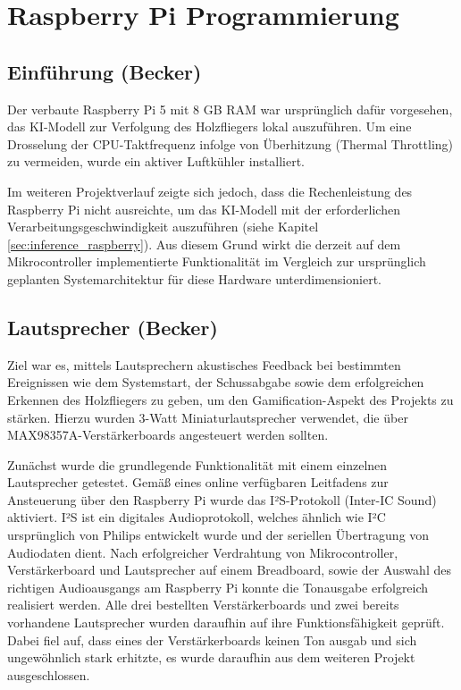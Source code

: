 \chapter{Raspberry Pi Programmierung}

\section{Einführung (Becker)}

Der verbaute Raspberry Pi 5 mit 8 GB RAM war ursprünglich dafür vorgesehen, das KI-Modell zur Verfolgung des Holzfliegers lokal auszuführen.
Um eine Drosselung der CPU-Taktfrequenz infolge von Überhitzung (Thermal Throttling) zu vermeiden, wurde ein aktiver Luftkühler installiert.

Im weiteren Projektverlauf zeigte sich jedoch, dass die Rechenleistung des Raspberry Pi nicht ausreichte, um das KI-Modell mit der erforderlichen Verarbeitungsgeschwindigkeit auszuführen (siehe Kapitel \ref{sec:inference_raspberry}).
Aus diesem Grund wirkt die derzeit auf dem Mikrocontroller implementierte Funktionalität im Vergleich zur ursprünglich geplanten Systemarchitektur für diese Hardware unterdimensioniert.

\section{Lautsprecher (Becker)}

Ziel war es, mittels Lautsprechern akustisches Feedback bei bestimmten Ereignissen wie dem Systemstart, der Schussabgabe sowie dem erfolgreichen Erkennen des Holzfliegers zu geben, um den Gamification-Aspekt des Projekts zu stärken. 
Hierzu wurden 3-Watt Miniaturlautsprecher verwendet, die über MAX98357A-Verstärkerboards angesteuert werden sollten.

Zunächst wurde die grundlegende Funktionalität mit einem einzelnen Lautsprecher getestet. Gemäß eines online verfügbaren Leitfadens zur Ansteuerung über den Raspberry Pi \cite{raspberry_i2s} wurde das I²S-Protokoll (Inter-IC Sound) aktiviert. 
I²S ist ein digitales Audioprotokoll, welches ähnlich wie I²C ursprünglich von Philips entwickelt wurde und der seriellen Übertragung von Audiodaten dient.
Nach erfolgreicher Verdrahtung von Mikrocontroller, Verstärkerboard und Lautsprecher auf einem Breadboard, sowie der Auswahl des richtigen Audioausgangs am Raspberry Pi konnte die Tonausgabe erfolgreich realisiert werden. 
Alle drei bestellten Verstärkerboards und zwei bereits vorhandene Lautsprecher wurden daraufhin auf ihre Funktionsfähigkeit geprüft. 
Dabei fiel auf, dass eines der Verstärkerboards keinen Ton ausgab und sich ungewöhnlich stark erhitzte, es wurde daraufhin aus dem weiteren Projekt ausgeschlossen.

